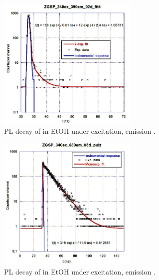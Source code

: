     \begin{figure}
        \centering
        \includegraphics[width=0.6\textwidth]{pictures/zgsp_januar_340ex_390em.PNG}
        \caption{PL decay of {\znoo} in EtOH under  excitation, emission .}
        \label{fig:zgsp_januar_340ex_390em}
    \end{figure}
    
    \begin{figure}
        \centering
        \includegraphics[width=0.6\textwidth]{pictures/zgsp_januar_340ex_630em.PNG}
        \caption{PL decay of {\znoo} in EtOH under  excitation, emission .}
        \label{fig:zgsp_januar_340ex_630em}
    \end{figure}
    
